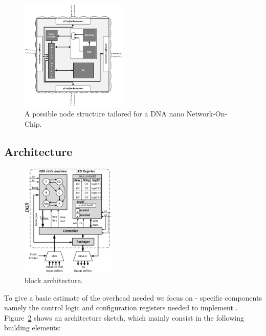 \begin{figure}
  \centering
  \includegraphics[width=0.45\textwidth]{pictures/node_structure.eps}
  \caption{A possible node structure tailored for a DNA nano Network-On-Chip.}
 \label{fig:node_structure}
\end{figure}
\subsection{\disr{} Architecture}
\label{ssec:disr_architecture}

\begin{figure}
  \centering
  \includegraphics[width=0.40\textwidth]{pictures/disr_rtl_updated.eps}
  \caption{\emph{\disr{}} block architecture.}
 \label{fig:implementation}
\end{figure}

To give a basic estimate of the overhead needed we focus on \disr{}-
specific components namely the control logic and configuration
registers needed to implement \disr{}. Figure~\ref{fig:implementation}
shows an architecture sketch, which mainly consist in the
following building elements:

